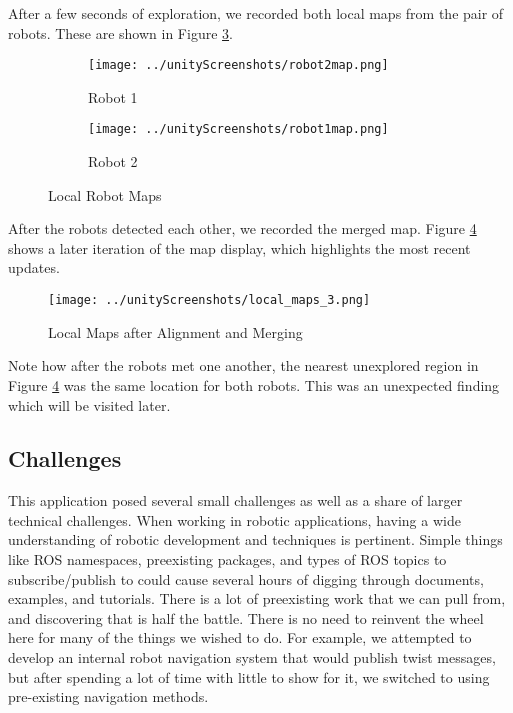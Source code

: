 \documentclass[11pt, conference]{IEEEtran}
\begin{document}
After a few seconds of exploration, we recorded both local maps from the pair of robots.
These are shown in Figure \ref{fig:local_maps}. 

\begin{figure}[ht]
\centering
\begin{subfigure}{.49\linewidth}
  \centering
  \texttt{[image: ../unityScreenshots/robot2map.png]}
  \caption{Robot 1}
  \label{fig:sub1}
\end{subfigure}%
\begin{subfigure}{.49\linewidth}
  \centering
  \texttt{[image: ../unityScreenshots/robot1map.png]}
  \caption{Robot 2}
  \label{fig:sub2}
\end{subfigure}
\caption{Local Robot Maps}
\label{fig:local_maps}
\end{figure}

After the robots detected each other, we recorded the merged map. Figure \ref{fig:local_map_3} shows a later iteration of the map display, which highlights the most recent updates.

\begin{figure}[ht]
\texttt{[image: ../unityScreenshots/local\_maps\_3.png]}
\caption{Local Maps after Alignment and Merging}
\label{fig:local_map_3}
\end{figure}

Note how after the robots met one another, the nearest unexplored region in Figure \ref{fig:local_map_3} was the same location for both robots. This was an unexpected finding which will be visited later. 


\subsection{Challenges}

This application posed several small challenges as well as a share of larger technical challenges. When working in robotic applications, having a wide understanding of robotic development and techniques is pertinent. Simple things like ROS namespaces, preexisting packages, and types of ROS topics to subscribe/publish to could cause several hours of digging through documents, examples, and tutorials. There is a lot of preexisting work that we can pull from, and discovering that is half the battle. There is no need to reinvent the wheel here for many of the things we wished to do. For example, we attempted to develop an internal robot navigation system that would publish twist messages, but after spending a lot of time with little to show for it, we switched to using pre-existing navigation methods.
\end{document}
